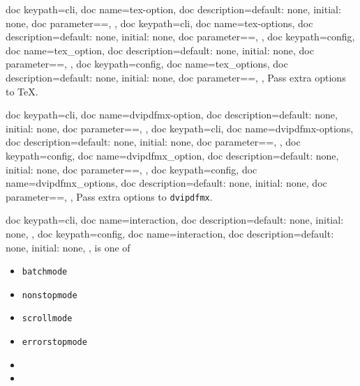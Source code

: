\documentclass[a4paper, 11pt]{scrartcl}
\begin{document}
\begin{docKeys}{
		{
			doc keypath=cli,
			doc name=tex-option,
			doc description={default: none, initial: none},
			doc parameter={=},
		},
		{
			doc keypath=cli,
			doc name=tex-options,
			doc description={default: none, initial: none},
			doc parameter={=},
		},
		{
			doc keypath=config,
			doc name=tex_option,
			doc description={default: none, initial: none},
			doc parameter={=},
		},
		{
			doc keypath=config,
			doc name=tex_options,
			doc description={default: none, initial: none},
			doc parameter={=},
		},
	}
	Pass extra options to \TeX.
\end{docKeys}
\begin{docKeys}{
		{
			doc keypath=cli,
			doc name=dvipdfmx-option,
			doc description={default: none, initial: none},
			doc parameter={=},
		},
		{
			doc keypath=cli,
			doc name=dvipdfmx-options,
			doc description={default: none, initial: none},
			doc parameter={=},
		},
		{
			doc keypath=config,
			doc name=dvipdfmx_option,
			doc description={default: none, initial: none},
			doc parameter={=},
		},
		{
			doc keypath=config,
			doc name=dvipdfmx_options,
			doc description={default: none, initial: none},
			doc parameter={=},
		},
	}
	Pass extra options to \texttt{dvipdfmx}.
\end{docKeys}
\begin{docKeys}[
		doc parameter={=\meta{interaction}},
	]{
		{
			doc keypath=cli,
			doc name=interaction,
			doc description={default: none, initial: none},
		},
		{
			doc keypath=config,
			doc name=interaction,
			doc description={default: none, initial: none},
		},
	}
	 is one of
	\begin{multicols}{3}
		\begin{itemize}
			\item \texttt{batchmode}
			\item \texttt{nonstopmode}
			\item \texttt{scrollmode}
			\item \texttt{errorstopmode}
			\item[]
			\item[]
		\end{itemize}
	\end{multicols}
\end{docKeys}
\end{document}
